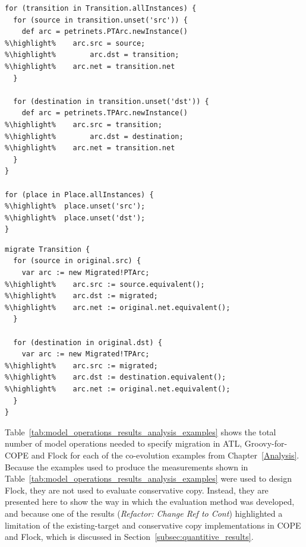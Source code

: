 \begin{lstlisting}[float=tbp, caption=The Petri nets model migration in Groovy-for-COPE, label=lst:petri_nets_cope, language=COPE]
for (transition in Transition.allInstances) {
  for (source in transition.unset('src')) {
    def arc = petrinets.PTArc.newInstance()
%\highlight%    arc.src = source;
%\highlight%		arc.dst = transition;
%\highlight%    arc.net = transition.net
  }

  for (destination in transition.unset('dst')) {
    def arc = petrinets.TPArc.newInstance() 
%\highlight%    arc.src = transition;
%\highlight%		arc.dst = destination;
%\highlight%    arc.net = transition.net
  }
}

for (place in Place.allInstances) {
%\highlight%  place.unset('src');
%\highlight%  place.unset('dst');
}
\end{lstlisting}

\begin{lstlisting}[float=tbp, caption=Petri nets model migration in Flock, label=lst:petri_nets_flock, language=Flock]
migrate Transition {
  for (source in original.src) {
    var arc := new Migrated!PTArc;
%\highlight%    arc.src := source.equivalent();
%\highlight%    arc.dst := migrated;
%\highlight%    arc.net := original.net.equivalent();
  }

  for (destination in original.dst) {
    var arc := new Migrated!TPArc;
%\highlight%    arc.src := migrated;
%\highlight%    arc.dst := destination.equivalent();
%\highlight%    arc.net := original.net.equivalent();
  }
}
\end{lstlisting}

Table~\ref{tab:model_operations_results_analysis_examples} shows the total number of model operations needed to specify migration in ATL, Groovy-for-COPE and Flock for each of the co-evolution examples from Chapter~\ref{Analysis}. Because the examples used to produce the measurements shown in Table~\ref{tab:model_operations_results_analysis_examples} were used to design Flock, they are not used to evaluate conservative copy. Instead, they are presented here to show the way in which the evaluation method was developed, and because one of the results (\emph{Refactor: Change Ref to Cont}) highlighted a limitation of the existing-target and conservative copy implementations in COPE and Flock, which is discussed in Section~\ref{subsec:quantitive_results}.

